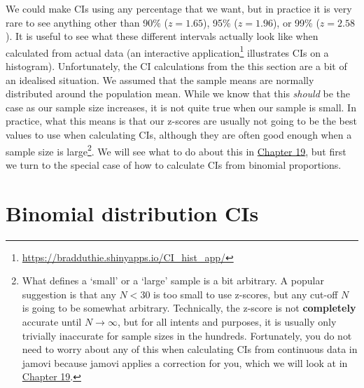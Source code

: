 \documentclass[
  openany]{krantz}
\begin{document}
We could make CIs using any percentage that we want, but in practice it is very rare to see anything other than 90\% (\(z = 1.65\)), 95\% (\(z = 1.96\)), or 99\% (\(z = 2.58\)).
It is useful to see what these different intervals actually look like when calculated from actual data (an interactive application\footnote{\url{https://bradduthie.shinyapps.io/CI_hist_app/}} illustrates CIs on a histogram).
Unfortunately, the CI calculations from the this section are a bit of an idealised situation.
We assumed that the sample means are normally distributed around the population mean.
While we know that this \emph{should} be the case as our sample size increases, it is not quite true when our sample is small.
In practice, what this means is that our z-scores are usually not going to be the best values to use when calculating CIs, although they are often good enough when a sample size is large\footnote{What defines a `small' or a `large' sample is a bit arbitrary. A popular suggestion \citep[e.g.,][ page 145]{Sokal1995} is that any \(N < 30\) is too small to use z-scores, but any cut-off \(N\) is going to be somewhat arbitrary. Technically, the z-score is not \textbf{completely} accurate until \(N \to \infty\), but for all intents and purposes, it is usually only trivially inaccurate for sample sizes in the hundreds. Fortunately, you do not need to worry about any of this when calculating CIs from continuous data in jamovi because jamovi applies a correction for you, which we will look at in \protect\hyperlink{Chapter_19}{Chapter 19}.}.
We will see what to do about this in \protect\hyperlink{Chapter_19}{Chapter 19}, but first we turn to the special case of how to calculate CIs from binomial proportions.

\hypertarget{binomial-distribution-cis}{%
\section{Binomial distribution CIs}\label{binomial-distribution-cis}}
\end{document}
